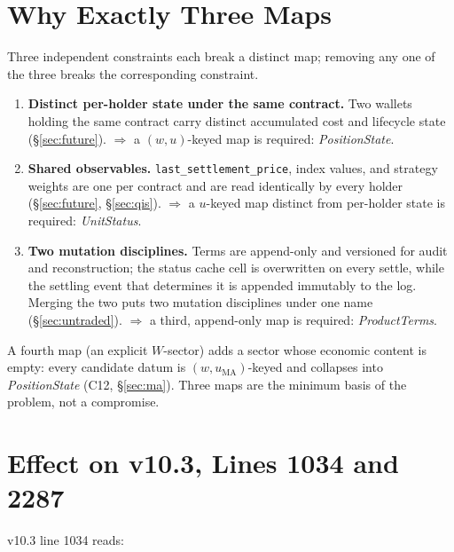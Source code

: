 \documentclass[11pt,a4paper]{article}
\begin{document}
\section{Why Exactly Three Maps}
\label{sec:why-three}

Three independent constraints each break a distinct map; removing any one of the three
breaks the corresponding constraint.

\begin{enumerate}[leftmargin=*]
\item \textbf{Distinct per-holder state under the same contract.} Two wallets holding the
same contract carry distinct accumulated cost and lifecycle state (\S\ref{sec:future}).
$\Rightarrow$ a $(w,u)$-keyed map is required: \emph{PositionState}.
\item \textbf{Shared observables.} \texttt{last\_settlement\_price}, index values, and
strategy weights are one per contract and are read identically by every holder
(\S\ref{sec:future}, \S\ref{sec:qis}). $\Rightarrow$ a $u$-keyed map distinct from
per-holder state is required: \emph{UnitStatus}.
\item \textbf{Two mutation disciplines.} Terms are append-only and versioned for audit and
reconstruction; the status cache cell is overwritten on every settle, while the settling event
that determines it is appended immutably to the log. Merging the two puts two mutation
disciplines under one name (\S\ref{sec:untraded}). $\Rightarrow$ a third, append-only map is
required: \emph{ProductTerms}.
\end{enumerate}

\noindent A fourth map (an explicit $W$-sector) adds a sector whose economic content is
empty: every candidate datum is $(w,u_{\mathrm{MA}})$-keyed and collapses into
\emph{PositionState} (C12, \S\ref{sec:ma}). Three maps are the minimum basis of the problem,
not a compromise.

\section{Effect on v10.3, Lines 1034 and 2287}
\label{sec:line1034}

v10.3 line 1034 reads:
\end{document}

